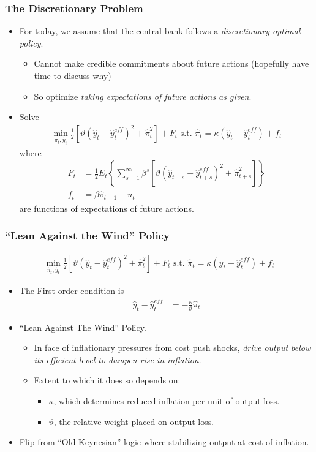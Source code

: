 \documentclass[11pt,aspectratio=169,xcolor={dvipsnames},hyperref={pdftex,pdfpagemode=UseNone,hidelinks,pdfdisplaydoctitle=true},usepdftitle=false]{beamer}
\begin{document}
\begin{frame}
\frametitle{The Discretionary Problem}
\begin{itemize}
	\item For today, we assume that the central bank follows a \emph{discretionary optimal policy}.
	\begin{itemize}
		\item Cannot make credible commitments about future actions (hopefully have time to discuss why)
		\item So optimize \emph{taking  expectations of future actions as given}.
	\end{itemize}
	\item Solve
		\begin{align*}\min_{\hat{\pi}_t,\hat{y}_{t}}\frac{1}{2}[\vartheta (\hat{y}_{t} - \hat{y}_{t}^{eff})^2+\hat{\pi}_{t}^2]+F_t\text{ s.t. }\hat{\pi}_t=\kappa(\hat{y}_{t} - \hat{y}_{t}^{eff})+f_t
	\end{align*}
	where
	\begin{align*}
		F_t &=\frac{1}{2}E_t\left\{\sum_{s=1}^{\infty}\beta^s\left[\vartheta (\hat{y}_{t+s} - \hat{y}_{t+s}^{eff})^2+\hat{\pi}_{t+s}^2\right]\right\} \\
		f_t &= \beta\hat{\pi}_{t+1}+u_t
	\end{align*}
 	are functions of expectations of future actions.
 	\end{itemize}
\end{frame}


\begin{frame}
\frametitle{``Lean Against the Wind'' Policy}
\begin{align*}\min_{\hat{\pi}_t,\hat{y}_t}\frac{1}{2}[\vartheta (\hat{y}_{t} - \hat{y}_{t}^{eff})^2+\hat{\pi}_{t}^2]+F_t\text{ s.t. }\hat{\pi}_t=\kappa(\hat{y}_{t} - \hat{y}_{t}^{eff})+f_t
	\end{align*}
\begin{itemize}
	\item The First order condition is	\begin{align*}
		\hat{y}_{t} - \hat{y}_{t}^{eff} &=-\frac{\kappa}{\vartheta}\hat{\pi}_{t}
	\end{align*}
	\item  ``Lean Against The Wind'' Policy.
	\begin{itemize}
		\item In face of inflationary pressures from cost push shocks, \emph{drive output below its efficient level to dampen rise in inflation}.
		\item Extent to which it does so depends on:
		\begin{itemize}
			\item $\kappa$, which determines reduced inflation per unit of output loss.
			\item $\vartheta$, the relative weight placed on output loss.
		\end{itemize}
	\end{itemize}
	\item Flip from ``Old Keynesian'' logic where stabilizing output at cost of inflation.
\end{itemize}
\end{frame}
\end{document}
